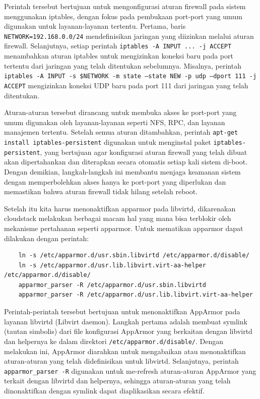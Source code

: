 Perintah tersebut bertujuan untuk mengonfigurasi aturan firewall pada sistem menggunakan iptables, dengan fokus pada pembukaan port-port yang umum digunakan untuk layanan-layanan tertentu. Pertama, baris \texttt{NETWORK=192.168.0.0/24} mendefinisikan jaringan yang diizinkan melalui aturan firewall. Selanjutnya, setiap perintah \texttt{iptables -A INPUT ... -j ACCEPT} menambahkan aturan iptables untuk mengizinkan koneksi baru pada port tertentu dari jaringan yang telah ditentukan sebelumnya. Misalnya, perintah \texttt{iptables -A INPUT -s \$NETWORK -m state --state NEW -p udp --dport 111 -j ACCEPT} mengizinkan koneksi UDP baru pada port 111 dari jaringan yang telah ditentukan.

Aturan-aturan tersebut dirancang untuk membuka akses ke port-port yang umum digunakan oleh layanan-layanan seperti NFS, RPC, dan layanan manajemen tertentu. Setelah semua aturan ditambahkan, perintah \texttt{apt-get install iptables-persistent} digunakan untuk menginstal paket \texttt{iptables-persistent}, yang bertujuan agar konfigurasi aturan firewall yang telah dibuat akan dipertahankan dan diterapkan secara otomatis setiap kali sistem di-boot. Dengan demikian, langkah-langkah ini membantu menjaga keamanan sistem dengan memperbolehkan akses hanya ke port-port yang diperlukan dan memastikan bahwa aturan firewall tidak hilang setelah reboot.

Setelah itu kita harus menonaktifkan apparmor pada libvirtd, dikarenakan cloudstack melakukan berbagai macam hal yang mana bisa terblokir oleh mekanisme pertahanan seperti apparmor\cite{apacheHostInstallation}. Untuk mematikan apparmor dapat dilakukan dengan perintah:

\begin{listing}[H]
    \begin{verbatim}
    ln -s /etc/apparmor.d/usr.sbin.libvirtd /etc/apparmor.d/disable/
    ln -s /etc/apparmor.d/usr.lib.libvirt.virt-aa-helper /etc/apparmor.d/disable/
    apparmor_parser -R /etc/apparmor.d/usr.sbin.libvirtd
    apparmor_parser -R /etc/apparmor.d/usr.lib.libvirt.virt-aa-helper
    \end{verbatim}
\end{listing}

Perintah-perintah tersebut bertujuan untuk menonaktifkan AppArmor pada layanan libvirtd (Libvirt daemon). Langkah pertama adalah membuat symlink (tautan simbolis) dari file konfigurasi AppArmor yang berkaitan dengan libvirtd dan helpernya ke dalam direktori \texttt{/etc/apparmor.d/disable/}. Dengan melakukan ini, AppArmor diarahkan untuk mengabaikan atau menonaktifkan aturan-aturan yang telah didefinisikan untuk libvirtd. Selanjutnya, perintah \texttt{apparmor\_parser -R} digunakan untuk me-refresh aturan-aturan AppArmor yang terkait dengan libvirtd dan helpernya, sehingga aturan-aturan yang telah dinonaktifkan dengan symlink dapat diaplikasikan secara efektif.

